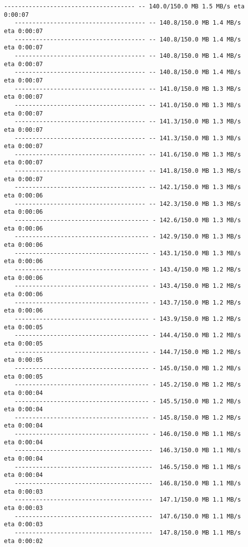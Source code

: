 \documentclass[11pt]{article}
\begin{document}
\begin{Verbatim}[commandchars=\\\{\}]
   ------------------------------------- -- 140.0/150.0 MB 1.5 MB/s eta 0:00:07
   ------------------------------------- -- 140.8/150.0 MB 1.4 MB/s eta 0:00:07
   ------------------------------------- -- 140.8/150.0 MB 1.4 MB/s eta 0:00:07
   ------------------------------------- -- 140.8/150.0 MB 1.4 MB/s eta 0:00:07
   ------------------------------------- -- 140.8/150.0 MB 1.4 MB/s eta 0:00:07
   ------------------------------------- -- 141.0/150.0 MB 1.3 MB/s eta 0:00:07
   ------------------------------------- -- 141.0/150.0 MB 1.3 MB/s eta 0:00:07
   ------------------------------------- -- 141.3/150.0 MB 1.3 MB/s eta 0:00:07
   ------------------------------------- -- 141.3/150.0 MB 1.3 MB/s eta 0:00:07
   ------------------------------------- -- 141.6/150.0 MB 1.3 MB/s eta 0:00:07
   ------------------------------------- -- 141.8/150.0 MB 1.3 MB/s eta 0:00:07
   ------------------------------------- -- 142.1/150.0 MB 1.3 MB/s eta 0:00:06
   ------------------------------------- -- 142.3/150.0 MB 1.3 MB/s eta 0:00:06
   -------------------------------------- - 142.6/150.0 MB 1.3 MB/s eta 0:00:06
   -------------------------------------- - 142.9/150.0 MB 1.3 MB/s eta 0:00:06
   -------------------------------------- - 143.1/150.0 MB 1.3 MB/s eta 0:00:06
   -------------------------------------- - 143.4/150.0 MB 1.2 MB/s eta 0:00:06
   -------------------------------------- - 143.4/150.0 MB 1.2 MB/s eta 0:00:06
   -------------------------------------- - 143.7/150.0 MB 1.2 MB/s eta 0:00:06
   -------------------------------------- - 143.9/150.0 MB 1.2 MB/s eta 0:00:05
   -------------------------------------- - 144.4/150.0 MB 1.2 MB/s eta 0:00:05
   -------------------------------------- - 144.7/150.0 MB 1.2 MB/s eta 0:00:05
   -------------------------------------- - 145.0/150.0 MB 1.2 MB/s eta 0:00:05
   -------------------------------------- - 145.2/150.0 MB 1.2 MB/s eta 0:00:04
   -------------------------------------- - 145.5/150.0 MB 1.2 MB/s eta 0:00:04
   -------------------------------------- - 145.8/150.0 MB 1.2 MB/s eta 0:00:04
   -------------------------------------- - 146.0/150.0 MB 1.1 MB/s eta 0:00:04
   ---------------------------------------  146.3/150.0 MB 1.1 MB/s eta 0:00:04
   ---------------------------------------  146.5/150.0 MB 1.1 MB/s eta 0:00:04
   ---------------------------------------  146.8/150.0 MB 1.1 MB/s eta 0:00:03
   ---------------------------------------  147.1/150.0 MB 1.1 MB/s eta 0:00:03
   ---------------------------------------  147.6/150.0 MB 1.1 MB/s eta 0:00:03
   ---------------------------------------  147.8/150.0 MB 1.1 MB/s eta 0:00:02

\end{Verbatim}
\end{document}
